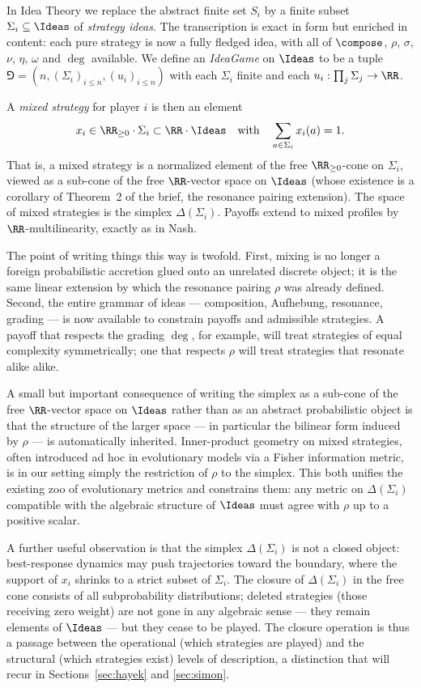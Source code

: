 In Idea Theory we replace the abstract finite set $S_i$ by a finite subset
$\Sigma_i \subseteq \Ideas$ of \emph{strategy ideas}. The transcription is
exact in form but enriched in content: each pure strategy is now a fully
fledged idea, with all of $\compose$, $\rho$, $\sigma$, $\nu$, $\eta$,
$\omega$ and $\deg$ available. We define an \emph{IdeaGame} on
$\Ideas$ to be a tuple $\Game = (n,(\Sigma_i)_{i\leq n},(u_i)_{i\leq n})$
with each $\Sigma_i$ finite and each $u_i:\prod_j \Sigma_j \to \RR$.

A \emph{mixed strategy} for player $i$ is then an element
\[
  x_i \in \RR_{\geq 0}\cdot \Sigma_i \subset \RR\cdot \Ideas
  \quad\text{with}\quad \sum_{a\in\Sigma_i} x_i(a) = 1.
\]
That is, a mixed strategy is a normalized element of the free
$\RR_{\geq 0}$-cone on $\Sigma_i$, viewed as a sub-cone of the free
$\RR$-vector space on $\Ideas$ (whose existence is a corollary of
Theorem~2 of the brief, the resonance pairing extension). The space of
mixed strategies is the simplex $\Delta(\Sigma_i)$. Payoffs extend to mixed
profiles by $\RR$-multilinearity, exactly as in Nash.

The point of writing things this way is twofold. First, mixing is no longer
a foreign probabilistic accretion glued onto an unrelated discrete object;
it is the same linear extension by which the resonance pairing $\rho$ was
already defined. Second, the entire grammar of ideas — composition,
Aufhebung, resonance, grading — is now available to constrain payoffs and
admissible strategies. A payoff that respects the grading $\deg$, for
example, will treat strategies of equal complexity symmetrically; one that
respects $\rho$ will treat strategies that resonate alike alike.

A small but important consequence of writing the simplex as a sub-cone
of the free $\RR$-vector space on $\Ideas$ rather than as an abstract
probabilistic object is that the structure of the larger space — in
particular the bilinear form induced by $\rho$ — is automatically
inherited. Inner-product geometry on mixed strategies, often introduced
ad hoc in evolutionary models via a Fisher information metric, is in our
setting simply the restriction of $\rho$ to the simplex. This both
unifies the existing zoo of evolutionary metrics and constrains them: any
metric on $\Delta(\Sigma_i)$ compatible with the algebraic structure of
$\Ideas$ must agree with $\rho$ up to a positive scalar.

A further useful observation is that the simplex $\Delta(\Sigma_i)$ is
not a closed object: best-response dynamics may push trajectories
toward the boundary, where the support of $x_i$ shrinks to a strict
subset of $\Sigma_i$. The closure of $\Delta(\Sigma_i)$ in the free
cone consists of all subprobability distributions; deleted strategies
(those receiving zero weight) are not gone in any algebraic sense — they
remain elements of $\Ideas$ — but they cease to be played. The closure
operation is thus a passage between the operational (which strategies
are played) and the structural (which strategies exist) levels of
description, a distinction that will recur in Sections~\ref{sec:hayek}
and \ref{sec:simon}.

